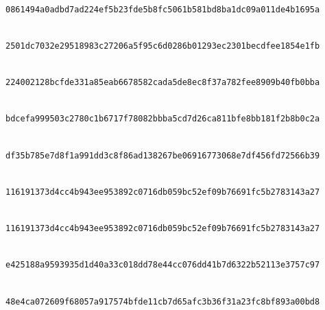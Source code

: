 \documentclass[pdflatex,sn-mathphys-num]{sn-jnl}%
\theoremstyle{thmstyleone}%
\theoremstyle{thmstyletwo}%
\theoremstyle{thmstylethree}%
\begin{document}
\begin{landscape}
\noindent{}\\
\texttt{0861494a\allowbreak{}0adbd7ad\allowbreak{}224ef5b2\allowbreak{}3fde5b8f\allowbreak{}c5061b58\allowbreak{}1bd8ba1d\allowbreak{}c09a011d\allowbreak{}e4b1695a}\par
\noindent{}\\
\texttt{2501dc70\allowbreak{}32e29518\allowbreak{}983c2720\allowbreak{}6a5f95c6\allowbreak{}d0286b01\allowbreak{}293ec230\allowbreak{}1becdfee\allowbreak{}1854e1fb}\par
\noindent{}\\
\texttt{22400212\allowbreak{}8bcfde33\allowbreak{}1a85eab6\allowbreak{}678582ca\allowbreak{}da5de8ec\allowbreak{}8f37a782\allowbreak{}fee8909b\allowbreak{}40fb0bba}\par
\noindent{}\\
\texttt{bdcefa99\allowbreak{}9503c278\allowbreak{}0c1b6717\allowbreak{}f78082bb\allowbreak{}ba5cd7d2\allowbreak{}6ca811bf\allowbreak{}e8bb181f\allowbreak{}2b8b0c2a}\par
\noindent{}\\
\texttt{df35b785\allowbreak{}e7d8f1a9\allowbreak{}91dd3c8f\allowbreak{}86ad1382\allowbreak{}67be0691\allowbreak{}6773068e\allowbreak{}7df456fd\allowbreak{}72566b39}\par
\noindent{}\\
\texttt{11619137\allowbreak{}3d4cc4b9\allowbreak{}43ee9538\allowbreak{}92c0716d\allowbreak{}b059bc52\allowbreak{}ef09b766\allowbreak{}91fc5b27\allowbreak{}83143a27}\par
\noindent{}\\
\texttt{11619137\allowbreak{}3d4cc4b9\allowbreak{}43ee9538\allowbreak{}92c0716d\allowbreak{}b059bc52\allowbreak{}ef09b766\allowbreak{}91fc5b27\allowbreak{}83143a27}\par
\noindent{}\\
\texttt{e425188a\allowbreak{}9593935d\allowbreak{}1d40a33c\allowbreak{}018dd78e\allowbreak{}44cc076d\allowbreak{}d41b7d63\allowbreak{}22b52113\allowbreak{}e3757c97}\par
\noindent{}\\
\texttt{48e4ca07\allowbreak{}2609f680\allowbreak{}57a91757\allowbreak{}4bfde11c\allowbreak{}b7d65afc\allowbreak{}3b36f31a\allowbreak{}23fc8bf8\allowbreak{}93a00bd8}\par

\end{landscape}
\end{document}
